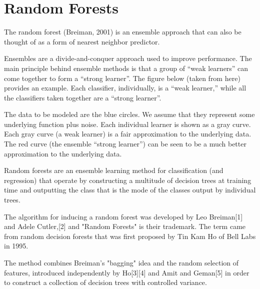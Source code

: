 \documentclass[caret-main.tex]{subfiles}
\begin{document}
\section{Random Forests}

The random forest (Breiman, 2001) is an ensemble approach that can also be thought of as a form of nearest neighbor predictor.

Ensembles are a divide-and-conquer approach used to improve performance. The main principle behind ensemble methods is that a group of “weak learners” can come together to form a “strong learner”. The figure below (taken from here) provides an example. Each classifier, individually, is a “weak learner,” while all the classifiers taken together are a “strong learner”.

The data to be modeled are the blue circles. We assume that they represent some underlying function plus noise. Each individual learner is shown as a gray curve. Each gray curve (a weak learner) is a fair approximation to the underlying data. The red curve (the ensemble “strong learner”) can be seen to be a much better approximation to the underlying data.
\newpage


Random forests are an ensemble learning method for classification (and regression) that operate by constructing a multitude of decision trees at training time and outputting the class that is the mode of the classes output by individual trees.

 The algorithm for inducing a random forest was developed by Leo Breiman[1] and Adele Cutler,[2] and "Random Forests" is their trademark. The term came from random decision forests that was first proposed by Tin Kam Ho of Bell Labs in 1995. 
 
 The method combines Breiman's "bagging" idea and the random selection of features, introduced independently by Ho[3][4] and Amit and Geman[5] in order to construct a collection of decision trees with controlled variance.
\end{document}

